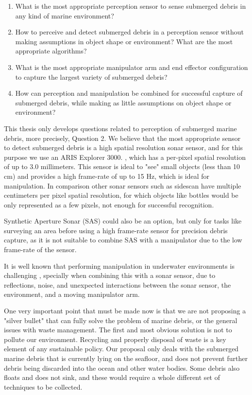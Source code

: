 \begin{enumerate}
    \item What is the most appropriate perception sensor to sense submerged debris in any kind of marine environment?
    \item How to perceive and detect submerged debris in a perception sensor without making assumptions in object shape or environment? What are the most appropriate algorithms?
    \item What is the most appropriate manipulator arm and end effector configuration to capture the largest variety of submerged debris?
    \item How can perception and manipulation be combined for successful capture of submerged debris, while making as little assumptions on object shape or environment?
\end{enumerate}

This thesis only develops questions related to perception of submerged marine debris, more precisely, Question 2. We believe that the most appropriate sensor to detect submerged debris is a high spatial resolution sonar sensor, and for this purpose we use an ARIS Explorer 3000. \cite[-4em]{arisExplorer3K}, which has a per-pixel spatial resolution of up to 3.0 millimeters. This sensor is ideal to "see" small objects (less than 10 cm) and provides a high frame-rate of up to 15 Hz, which is ideal for manipulation. In comparison other sonar sensors such as sidescan have multiple centimeters per pixel spatial resolution, for which objects like bottles would be only represented as a few pixels, not enough for successful recognition.

Synthetic Aperture Sonar (SAS) could also be an option, but only for tasks like surveying an area before using a high frame-rate sensor for precision debris capture, as it is not suitable to combine SAS with a manipulator due to the low frame-rate of the sensor.

It is well known that performing manipulation in underwater environments is challenging \cite{ridao2014intervention}, specially when combining this with a sonar sensor, due to reflections, noise, and unexpected interactions between the sonar sensor, the environment, and a moving manipulator arm.

One very important point that must be made now is that we are not proposing a "silver bullet" that can fully solve the problem of marine debris, or the general issues with waste management. The first and most obvious solution is not to pollute our environment. Recycling and properly disposal of waste is a key element of any sustainable policy. Our proposal only deals with the submerged marine debris that is currently lying on the seafloor, and does not prevent further debris being discarded into the ocean and other water bodies. Some debris also floats and does not sink, and these would require a whole different set of techniques to be collected.

